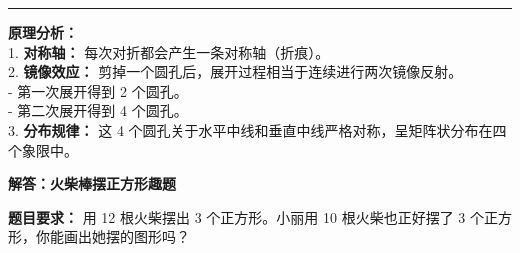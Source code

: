 \vspace{1.0cm}
\hrule
\vspace{0.4cm}

{\small
\textbf{原理分析：} \\
1. \textbf{对称轴：} 每次对折都会产生一条对称轴（折痕）。 \\
2. \textbf{镜像效应：} 剪掉一个圆孔后，展开过程相当于连续进行两次镜像反射。 \\
   - 第一次展开得到 2 个圆孔。 \\
   - 第二次展开得到 4 个圆孔。 \\
3. \textbf{分布规律：} 这 4 个圆孔关于水平中线和垂直中线严格对称，呈矩阵状分布在四个象限中。
}




\newpage

\begin{center}
  {\large\bfseries 解答：火柴棒摆正方形趣题}
\end{center}

\vspace{0.6cm}

\noindent
{\small \textbf{题目要求：} 用 12 根火柴摆出 3 个正方形。小丽用 10 根火柴也正好摆了 3 个正方形，你能画出她摆的图形吗？}

\vspace{1.0cm}

